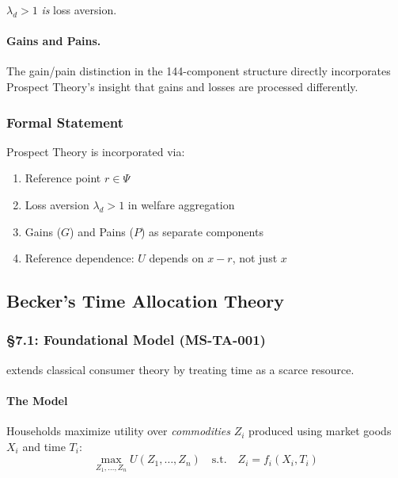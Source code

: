 $\lambda_d > 1$ \emph{is} loss aversion.

\paragraph{Gains and Pains.}
The gain/pain distinction in the 144-component structure directly incorporates
Prospect Theory's insight that gains and losses are processed differently.

\subsubsection{Formal Statement}

\begin{proposition}
Prospect Theory is incorporated via:
\begin{enumerate}
  \item Reference point $r \in \Psi$
  \item Loss aversion $\lambda_d > 1$ in welfare aggregation
  \item Gains ($G$) and Pains ($P$) as separate components
  \item Reference dependence: $U$ depends on $x - r$, not just $x$
\end{enumerate}
\end{proposition}


\subsection{Becker's Time Allocation Theory}
\label{sec:der-time-allocation}

\subsubsection{§7.1: Foundational Model (MS-TA-001)}

\citet{PAP-becker1965theory} extends classical consumer theory by treating time as a scarce resource.

\paragraph{The Model}
Households maximize utility over \emph{commodities} $Z_i$ produced using market goods $X_i$ and time $T_i$:
\begin{equation}
\max_{Z_1, \ldots, Z_n} U(Z_1, \ldots, Z_n) \quad \text{s.t.} \quad Z_i = f_i(X_i, T_i)
\end{equation}

